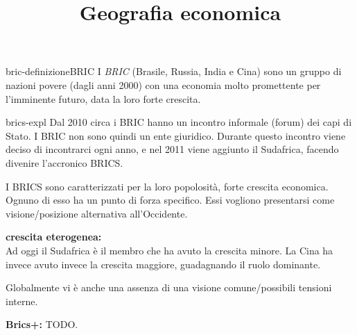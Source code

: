 \documentclass[preview]{standalone}
\begin{document}
\title{Geografia economica}
\genpage

\begin{snippetdefinition}{bric-definizione}{BRIC}
    I \textit{BRIC} (Brasile, Russia, India e Cina)
    sono un gruppo di nazioni povere (dagli anni 2000) con una economia
    molto promettente per l'imminente futuro, data la loro forte crescita. 
\end{snippetdefinition}

\begin{snippet}{brics-expl}
    Dal 2010 circa i BRIC hanno un incontro informale (forum) dei capi di Stato.
    I BRIC non sono quindi un ente giuridico.
    Durante questo incontro viene deciso di incontrarci ogni anno, e nel 2011 viene aggiunto il Sudafrica,
    facendo divenire l'accronico BRICS.
    
    I BRICS sono caratterizzati per la loro popolosità, forte crescita economica.
    Ognuno di esso ha un punto di forza specifico.
    Essi vogliono presentarsi come visione/posizione alternativa all'Occidente.
    
    \textbf{crescita eterogenea:} \\
    Ad oggi il Sudafrica è il membro che ha avuto la crescita minore.
    La Cina ha invece avuto invece la crescita maggiore, guadagnando il ruolo dominante.
    
    Globalmente vi è anche una assenza di una visione comune/possibili tensioni interne.
    
    \textbf{Brics+:} TODO.
\end{snippet}
\end{document}
